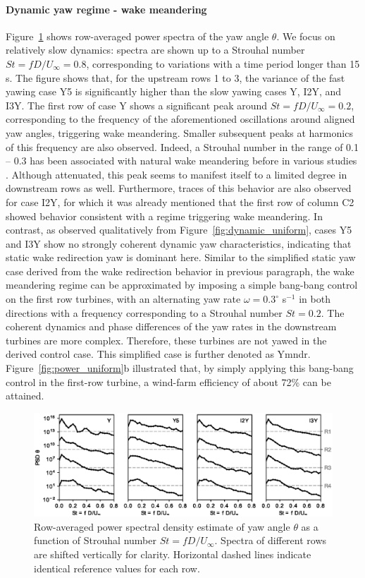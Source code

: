 \documentclass[energies,article,submit,moreauthors,latex,10pt,a4paper]{mdpi}
\begin{document}
\paragraph{Dynamic yaw regime - wake meandering}
\noindent Figure~\ref{fig:spec_uniform} shows row-averaged power spectra of the yaw angle $\theta$. We focus on relatively slow dynamics: spectra are shown up to a Strouhal number $St = f D/U_\infty = 0.8$, corresponding to variations with a time period longer than 15 s. The figure shows that, for the upstream rows 1 to 3, the variance of the fast yawing case Y5 is significantly higher than the slow yawing cases Y, I2Y, and I3Y. The first row of case Y shows a significant peak around $St = f D/U_\infty= 0.2$, corresponding to the frequency of the aforementioned oscillations around aligned yaw angles, triggering wake meandering. Smaller subsequent peaks at harmonics of this frequency are also observed. Indeed, a Strouhal number in the range of 0.1 -- 0.3 has been associated with natural wake meandering before in various studies \cite{medici2008measurements, howard2015statistics}. Although attenuated, this peak seems to manifest itself to a limited degree in downstream rows as well. Furthermore, traces of this behavior are also observed for case I2Y, for which it was already mentioned that the first row of column C2 showed behavior consistent with a regime triggering wake meandering. In contrast, as observed qualitatively from Figure~\ref{fig:dynamic_uniform}, cases Y5 and I3Y show no strongly coherent dynamic yaw characteristics, indicating that static wake redirection yaw is dominant here. Similar to the simplified static yaw case derived from the wake redirection behavior in previous paragraph, the wake meandering regime can be approximated by imposing a simple bang-bang control on the first row turbines, with an alternating yaw rate $\omega = 0.3^\circ$ s$^{-1}$ in both directions with a frequency corresponding to a Strouhal number $St = 0.2$. The coherent dynamics and phase differences of the yaw rates in the downstream turbines are more complex. Therefore, these turbines are not yawed in the derived control case. This simplified case is further denoted as Ymndr. Figure~\ref{fig:power_uniform}b illustrated that, by simply applying this bang-bang control in the first-row turbine, a wind-farm efficiency of about 72\% can be attained.

\begin{figure}
	\includegraphics[width=\textwidth]{figure9}
	\caption{Row-averaged power spectral density estimate of yaw angle $\theta$ as a function of Strouhal number $St = f D/U_\infty$. Spectra of different rows are shifted vertically for clarity. Horizontal dashed lines indicate identical reference values for each row.\label{fig:spec_uniform}}
\end{figure}
\end{document}
